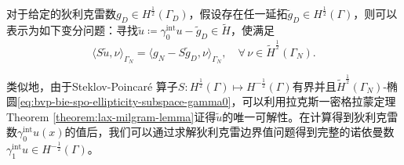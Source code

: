 对于给定的狄利克雷数$g_{D} \in H^{\frac{1}{2}}(\Gamma_{D})$，假设存在任一延拓$\widetilde{g}_{D} \in H^{\frac{1}{2}}(\Gamma)$，则可以表示为如下变分问题：寻找$\widetilde{u} \coloneqq \gamma_{0}^{\text{int}} u - \widetilde{g}_{D} \in \widetilde{H}$，使满足
\begin{equation}
  \label{eq:bie-mixed-indirect-approach}
  \langle S \widetilde{u}, \nu \rangle_{\Gamma_{N}}
  = \langle
  g_{N} - S \widetilde{g}_{D}, \nu
  \rangle_{\Gamma_{N}}, \quad \forall \, \nu \in \widetilde{H}^{\frac{1}{2}}(\Gamma_{N}).
\end{equation}

类似地，由于Steklov-Poincaré 算子$S: H^{\frac{1}{2}}(\Gamma) \mapsto H^{-\frac{1}{2}}(\Gamma)$有界并且$\widetilde{H}^{\frac{1}{2}}(\Gamma_{N})$-椭圆\eqref{eq:bvp-bie-spo-ellipticity-subspace-gamma0}，可以利用拉克斯一密格拉蒙定理Theorem \ref{theorem:lax-milgram-lemma}证得$\widetilde{u}$的唯一可解性。在计算得到狄利克雷数$\gamma_{0}^{\text{int}} u(x)$的值后，我们可以通过求解狄利克雷边界值问题得到完整的诺依曼数$\gamma_{1}^{\text{int}} u \in H^{-\frac{1}{2}}(\Gamma)$。

